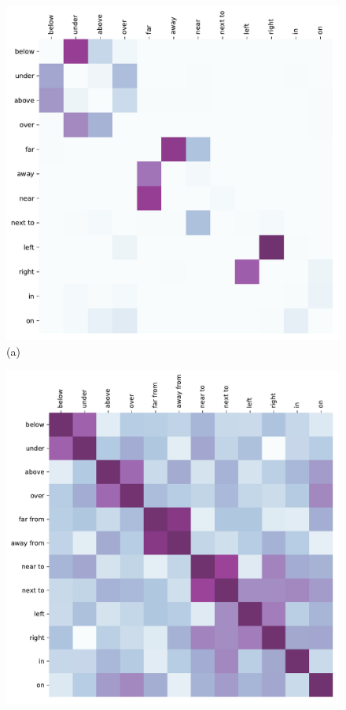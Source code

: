 \begin{figure}
  \begin{center}
    \begin{minipage}{0.4\linewidth}
      \begin{center}
      \includegraphics[width=1\columnwidth]{studies/splu2019/figures/word_association_test.pdf} \\
      (a)
      \end{center}%
    \end{minipage}%
    \begin{minipage}{0.4\linewidth}
      \begin{center}
      \includegraphics[width=1\columnwidth]{studies/splu2019/figures/relatedness_judgments.pdf} \\

\end{center}
\end{minipage}
\end{center}
\end{figure}
